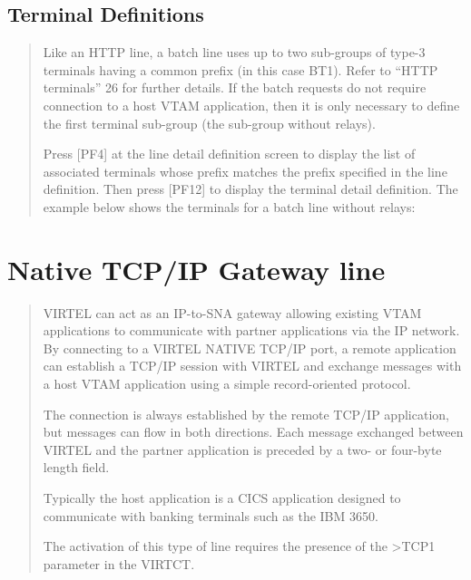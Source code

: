 \documentclass[letterpaper,10pt,english]{sphinxmanual}
\begin{document}

\subsection{Terminal Definitions}
\label{\detokenize{connectivity_guide:id11}}\label{\detokenize{connectivity_guide:index-33}}\begin{quote}

Like an HTTP line, a batch line uses up to two sub-groups of type-3 terminals having a common prefix (in this case BT1). Refer to “HTTP terminals” 26 for further details. If the batch requests do not require connection to a host VTAM application, then it is only necessary to define the first terminal sub-group (the sub-group without relays).

Press {[}PF4{]} at the line detail definition screen to display the list of associated terminals whose prefix matches the prefix specified in the line definition. Then press {[}PF12{]} to display the terminal detail definition. The example below shows the terminals for a batch line without relays:
\end{quote}



\newpage


\section{Native TCP/IP Gateway line}
\label{\detokenize{connectivity_guide:native-tcp-ip-gateway-line}}\label{\detokenize{connectivity_guide:index-34}}\begin{quote}

VIRTEL can act as an IP-to-SNA gateway allowing existing VTAM applications to communicate with partner applications via the IP network. By connecting to a VIRTEL NATIVE TCP/IP port, a remote application can establish a TCP/IP session with VIRTEL and exchange messages with a host VTAM application using a simple record-oriented protocol.

The connection is always established by the remote TCP/IP application, but messages can flow in both directions. Each message  exchanged between VIRTEL and the partner application is preceded by a two- or four-byte length field.

Typically the host application is a CICS application designed to communicate with banking terminals such as the IBM 3650.

The activation of this type of line requires the presence of the \textgreater{}TCP1 parameter in the VIRTCT.
\end{quote}
\end{document}
